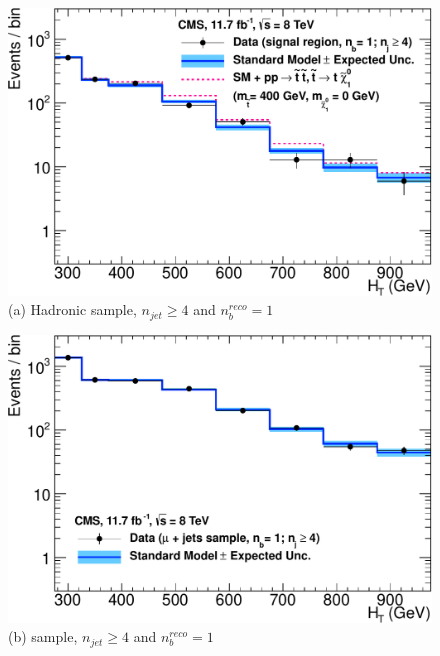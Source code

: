 \begin{figure}[ht]
\footnotesize
\centering
\begin{minipage}[b]{0.48 \linewidth}
\includegraphics[width = 1.0\linewidth]{plots/hadronic_1b_ge4j_logy.pdf}
\centering (a)  Hadronic sample, $n_{jet} \geq 4$ and $n_{b}^{reco} = 1$ 
\end{minipage}
\quad
\begin{minipage}[b]{0.48\linewidth}
\includegraphics[width = 1.0\linewidth]{plots/muon_1b_ge4j_logy.pdf}
\centering (b)  \mupjets sample, $n_{jet} \geq 4$ and $n_{b}^{reco} = 1$  
\end{minipage} \\
\vspace{0.4cm}
\begin{minipage}[b]{0.48 \linewidth}

\end{minipage}
\end{figure}
